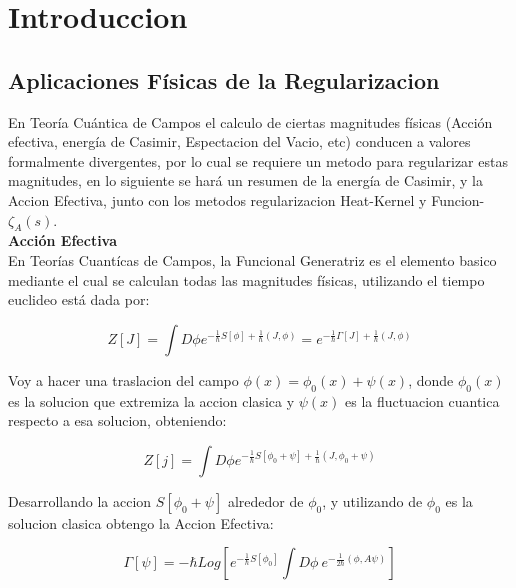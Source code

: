 \chapter{Introduccion}


\section{Aplicaciones Físicas de la Regularizacion}

En Teoría Cuántica de Campos el calculo de ciertas magnitudes físicas (Acción efectiva, energía de Casimir, Espectacion del Vacio, etc) conducen a valores formalmente divergentes, por lo cual se requiere un metodo para regularizar estas magnitudes, en lo siguiente se hará un resumen de la energía de Casimir, y la Accion Efectiva, junto con los metodos regularizacion Heat-Kernel y Funcion-$ \zeta _A (s) $.\\





\textbf{Acción Efectiva}\\


En Teorías Cuantícas de Campos, la Funcional Generatriz es el elemento basico mediante el cual se calculan todas las magnitudes físicas, utilizando el tiempo euclideo está dada por:

\begin{equation}
Z[J] = 
\int D \phi
e^{-\frac{1}{\hbar} S[\phi] + \frac{1}{\hbar} (J,\phi) }  =
e ^{-\frac{1}{\hbar} \Gamma[J] + \frac{1}{\hbar} (J,\phi )}
\end{equation}

Voy a hacer una traslacion del campo $\phi (x) = \phi _0 (x) + \psi (x) $, donde $\phi _0 (x)$ es la solucion que extremiza la accion clasica y $\psi (x)$ es la fluctuacion cuantica respecto a esa solucion, obteniendo:

\begin{equation}
Z[j] = 
\int D \phi
e^{-\frac{1}{\hbar} S[\phi _0 + \psi] + \frac{1}{\hbar} (J,\phi _0 + \psi ) }  
\end{equation}

Desarrollando la accion $S[\phi _0 + \psi]$ alrededor de $\phi _0$, y utilizando de $\phi _0$ es la solucion clasica obtengo la Accion Efectiva:

\begin{equation}
\Gamma [\psi] = 
- \hbar 
Log
\left[
	e ^{-\frac{1}{\hbar} S[\phi _0] }
	\int D \phi \
	e ^{-\frac{1}{2 \hbar} (\phi,A \psi) }
	\right]
\end{equation}



